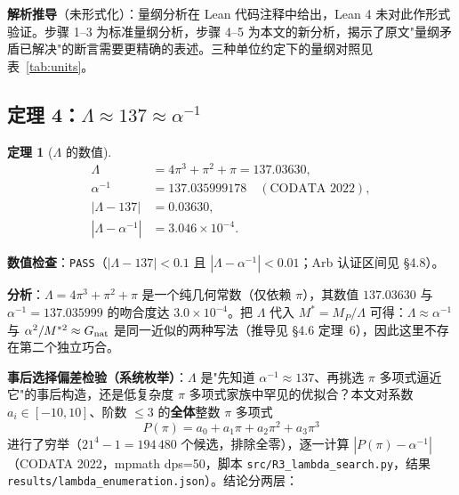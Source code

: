\documentclass[12pt,a4paper]{article}
\newtheorem{theorem}{定理}
\begin{document}
\noindent\textbf{解析推导}（未形式化）：量纲分析在 Lean 代码注释中给出，Lean 4 未对此作形式验证。步骤 1--3 为标准量纲分析，步骤 4--5 为本文的新分析，揭示了原文"量纲矛盾已解决"的断言需要更精确的表述。三种单位约定下的量纲对照见表~\ref{tab:units}。

\subsection{定理 4：$\Lambda \approx 137 \approx \alpha^{-1}$}

\begin{theorem}[$\Lambda$ 的数值]
\begin{align}
  \Lambda &= 4\pi^3 + \pi^2 + \pi = 137.03630, \\
  \alpha^{-1} &= 137.035999178 \quad (\text{CODATA 2022}), \\
  |\Lambda - 137| &= 0.03630, \\
  |\Lambda - \alpha^{-1}| &= 3.046\times10^{-4}.
\end{align}
\end{theorem}

\noindent\textbf{数值检查}：\texttt{PASS}（$|\Lambda - 137| < 0.1$ 且 $|\Lambda - \alpha^{-1}| < 0.01$；Arb 认证区间见 §4.8）。

\medskip

\textbf{分析}：$\Lambda = 4\pi^3+\pi^2+\pi$ 是一个纯几何常数（仅依赖 $\pi$），其数值 $137.03630$ 与 $\alpha^{-1} = 137.035999$ 的吻合度达 $3.0\times10^{-4}$。把 $\Lambda$ 代入 $M^*=M_P/\Lambda$ 可得：$\Lambda\approx\alpha^{-1}$ 与 $\alpha^2/M^{*2}\approx G_{\rm nat}$ 是同一近似的两种写法（推导见 §4.6 定理~6），因此这里不存在第二个独立巧合。

\medskip

\textbf{事后选择偏差检验（系统枚举）}：$\Lambda$ 是"先知道 $\alpha^{-1}\approx 137$、再挑选 $\pi$ 多项式逼近它"的事后构造，还是低复杂度 $\pi$ 多项式家族中罕见的优拟合？本文对系数 $a_i \in [-10, 10]$、阶数 $\le 3$ 的\textbf{全体}整数 $\pi$ 多项式
\[
  P(\pi) = a_0 + a_1\pi + a_2\pi^2 + a_3\pi^3
\]
进行了穷举（$21^4 - 1 = 194\,480$ 个候选，排除全零），逐一计算 $|P(\pi) - \alpha^{-1}|$（CODATA 2022，mpmath dps=50，脚本 \texttt{src/R3\_\allowbreak{}lambda\_\allowbreak{}search.py}，结果 \texttt{results/lambda\_\allowbreak{}enumeration.json}）。结论分两层：
\end{document}
